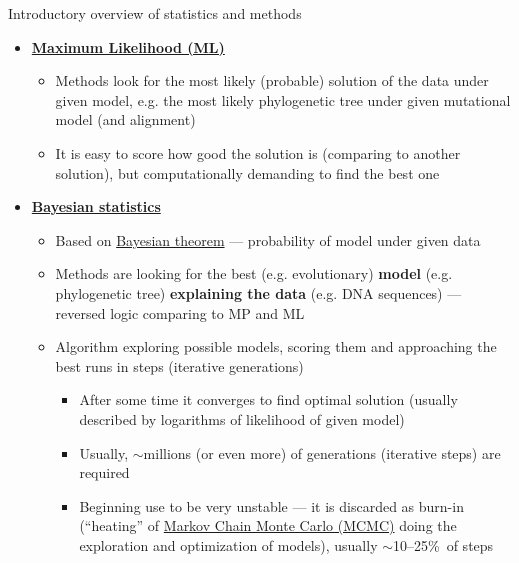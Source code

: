 \documentclass[compress, xelatex, 11pt, xcolor=svgnames, aspectratio=169, url={hyphens, lowtilde}]{beamer}
\begin{document}
\begin{frame}[allowframebreaks]{Introductory overview of statistics and methods}
\begin{itemize}
		\begin{itemize}
			\item Generally, the methods are looking for the most simple solution under given model, e.g. to construct phylogenetic tree requiring the lowest number of evolutionary changes (DNA mutations) under given alignment
			\item It is easy to score how good the solution is (comparing to another solution), but computationally demanding to find the best one
		\end{itemize}
		\item \textbf{\href{https://en.wikipedia.org/wiki/Maximum_likelihood_estimation}{Maximum Likelihood (ML)}}
		\begin{itemize}
			\item Methods look for the most likely (probable) solution of the data under given model, e.g. the most likely phylogenetic tree under given mutational model (and alignment)
			\item It is easy to score how good the solution is (comparing to another solution), but computationally demanding to find the best one
		\end{itemize}
		\item \textbf{\href{https://en.wikipedia.org/wiki/Bayesian_statistics}{Bayesian statistics}}
		\begin{itemize}
			\item Based on \href{https://en.wikipedia.org/wiki/Bayes_theorem}{Bayesian theorem} --- probability of model under given data
			\item Methods are looking for the best (e.g. evolutionary) \textbf{model} (e.g. phylogenetic tree) \textbf{explaining the data} (e.g. DNA sequences) --- reversed logic comparing to MP and ML
			\item Algorithm exploring possible models, scoring them and approaching the best runs in steps (iterative generations)
			\begin{itemize}
				\item After some time it converges to find optimal solution (usually described by logarithms of likelihood of given model)
				\item Usually, $\sim$millions (or even more) of generations (iterative steps) are required
				\item Beginning use to be very unstable --- it is discarded as burn-in (\enquote{heating} of \href{https://en.wikipedia.org/wiki/Markov_chain_Monte_Carlo}{Markov Chain Monte Carlo (MCMC)} doing the exploration and optimization of models), usually $\sim$10--25\%~of steps

\end{itemize}
\end{itemize}
\end{itemize}
\end{frame}
\end{document}
